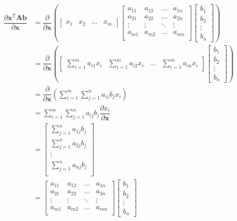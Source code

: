 \documentclass{article}
\newcommand{\trans}{\mathsf{T}}
\begin{document}
\begin{align}
    \dfrac{\partial \mathbf{x}^\trans \mathbf{A} \mathbf{b}}{\partial \mathbf{x}} &= \dfrac{\partial}{\partial \mathbf{x}} \left(
    \begin{bmatrix}
        x_{1} & x_{2} & \dots & x_{m}
    \end{bmatrix}
    \begin{bmatrix}
        a_{11} & a_{12} & \dots & a_{1n} \\
        a_{21} & a_{22} & \dots & a_{2n} \\
        \vdots & \vdots & \ddots & \vdots \\
        a_{m1} & a_{m2} & \dots & a_{mn} \\
    \end{bmatrix} \begin{bmatrix}
        b_{1} \\ b_{2} \\ \vdots \\ b_{n}
    \end{bmatrix} \right) \\
    &= \dfrac{\partial}{\partial \mathbf{x}} \left(
			\begin{bmatrix}
				\displaystyle \sum_{i = 1}^{m} a_{i1}x_{i} & 
				\displaystyle \sum_{i = 1}^{m} a_{i2}x_{i} & 
				\dots & 
				\displaystyle \sum_{i = 1}^{m} a_{in}x_{i}
			\end{bmatrix} \begin{bmatrix}
				b_{1} \\ b_{2} \\ \vdots \\ b_{n}
			\end{bmatrix} \right) \\
    &= \dfrac{\partial}{\partial \mathbf{x}} \left(
        \sum_{i = 1}^{m}\sum_{j = 1}^{n} a_{ij} b_{j} x_{i}
    \right) \\
    &= \sum_{i = 1}^{m}\sum_{j = 1}^{n} a_{ij} b_{j} \dfrac{\partial x_{i}}{\partial \mathbf{x}} \\
    &= \begin{bmatrix}
        \sum_{j = 1}^{n} a_{1j} b_{j} \\
        \sum_{j = 1}^{n} a_{2j} b_{j} \\
        \vdots \\
        \sum_{j = 1}^{n} a_{nj} b_{j} \\
    \end{bmatrix} \\
    &= \begin{bmatrix}
        a_{11} & a_{12} & \dots & a_{1n} \\
        a_{21} & a_{22} & \dots & a_{2n} \\
        \vdots & \vdots & \ddots & \vdots \\
        a_{m1} & a_{m2} & \dots & a_{mn} \\
    \end{bmatrix}
    \begin{bmatrix}
        b_1 \\
        b_2 \\
        \vdots \\
        b_n
    \end{bmatrix}
\end{align}
\end{document}
